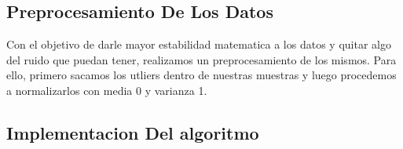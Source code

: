 \subsection{Preprocesamiento De Los Datos} 
Con el objetivo de darle mayor estabilidad matematica a los datos y quitar algo del ruido que puedan tener, realizamos un preprocesamiento de los mismos. Para ello, primero sacamos los utliers dentro de nuestras muestras y luego procedemos a normalizarlos con media 0 y varianza 1.

\subsection{Implementacion Del algoritmo} 